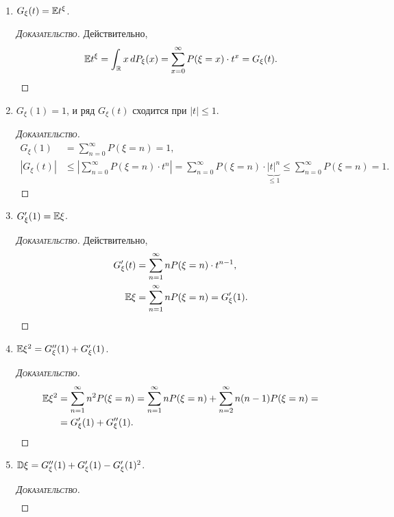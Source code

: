 \documentclass[../main.tex]{subfiles}
\begin{document}
\begin{prop}\
 \begin{enumerate}
  \item $G_\xi(t) = \mathbb E t^{\xi}$.
   \begin{proof}[\normalfont\textsc{Доказательство}]
    Действительно,
    \begin{align*}
     \mathbb E t^{\xi} = \int_{\mathbb{R}} x\,dP_\xi(x) = \sum_{x=0}^{\infty} P(\xi=x) \cdot t ^{x} = G_\xi(t).
    \end{align*}
   \end{proof}
  \item $ G_\xi(1) = 1 $, и ряд $ G_\xi(t) $ сходится при $ \left| t \right| \leqslant 1 $.
   \begin{proof}[\normalfont\textsc{Доказательство}]
    \begin{align*}
     G_\xi(1) &= \sum_{n=0}^{\infty}P(\xi=n) = 1,\\
     \left| G_\xi(t) \right| &\leqslant \left| \sum_{n = 0}^\infty P(\xi = n) \cdot t^{n} \right| = \sum_{n = 0}^\infty P(\xi = n) \cdot \underbrace{|t|^{n}}_{\leq 1} \leqslant \sum_{n = 0}^\infty P(\xi = n) = 1.
    \end{align*}
   \end{proof}
  \item $ G'_\xi(1) = \mathbb E \xi $. 
   \begin{proof}[\normalfont\textsc{Доказательство}]
    Действительно,
    \begin{align*}
     G_\xi'(t) &= \sum_{n=1}^{\infty}nP(\xi = n) \cdot t^{n-1},\\
     \mathbb E\xi &= \sum_{n=1}^{\infty} nP(\xi=n) = G_\xi'(1).
    \end{align*}
   \end{proof}
  \item $ \mathbb E\xi^{2} = G''_\xi(1) + G'_\xi(1) $.
   \begin{proof}[\normalfont\textsc{Доказательство}]
    \begin{align*}
     \mathbb E\xi^{2} &= \sum_{n=1}^{\infty} n^{2}P(\xi = n) = \sum_{n=1}^{\infty} nP(\xi=n) + \sum_{n=2}^{\infty} n(n-1)P(\xi = n) = \\
     &= G'_\xi(1) + G''_\xi(1).
    \end{align*}
   \end{proof}
  \item $ \mathbb D\xi = G''_\xi(1) + G'_\xi(1) - G'_\xi(1)^{2} $.
   \begin{proof}[\normalfont\textsc{Доказательство}]
    \begin{align*}

\end{align*}
\end{proof}
\end{enumerate}
\end{prop}
\end{document}
